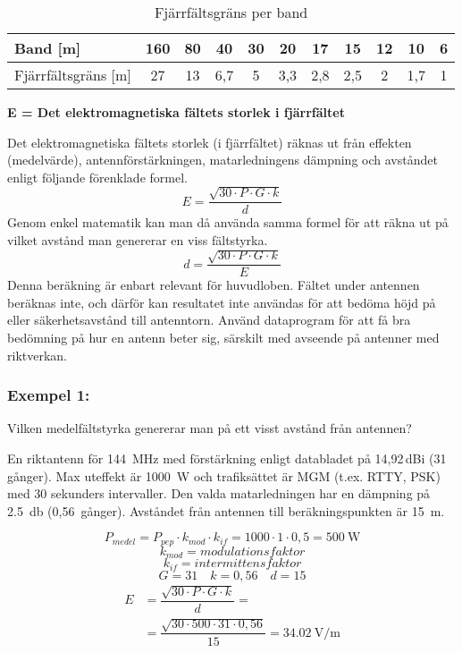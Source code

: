 \begin{table*}[ht]
  \begin{center}
    \begin{tabular}{|l|c|c|c|c|c|c|c|c|c|c|}
	\hline
	Band [m] & 160 & 80 & 40 & 30 & 20 & 17 & 15 & 12 & 10 & 6 \\ \hline
	Fjärrfältsgräns [m] & 27 & 13 & 6,7 & 5 & 3,3 & 2,8 & 2,5 & 2 & 1,7 & 1 \\ \hline
    \end{tabular}
    \caption{Fjärrfältsgräns per band}
    \label{tab:fjfltgr}
  \end{center}
\end{table*}

\noindent\textbf{E = Det elektromagnetiska fältets storlek i fjärrfältet}

Det elektromagnetiska fältets storlek (i fjärrfältet) räknas ut från
effekten (medelvärde), antennförstärkningen, matarledningens dämpning
och avståndet enligt följande förenklade formel.
\[E=\dfrac{\sqrt{30 \cdot P \cdot G \cdot k}}{d}\]
Genom enkel matematik kan man då använda samma formel för att räkna
ut på vilket avstånd man genererar en viss fältstyrka.
\[d=\dfrac{\sqrt{30 \cdot P \cdot G \cdot k}}{E}\]
Denna beräkning är enbart relevant för huvudloben.
Fältet under antennen beräknas inte, och därför kan resultatet inte användas
för att bedöma höjd på eller säkerhetsavstånd till antenntorn.
Använd dataprogram för att få bra bedömning på hur en antenn beter sig,
särskilt med avseende på antenner med riktverkan.

\subsubsection{Exempel 1:}

Vilken medelfältstyrka genererar man på ett visst avstånd från antennen?

En riktantenn för \qty{144}{\mega\hertz} med förstärkning enligt databladet på
14,92\,dBi (31 gånger).
Max uteffekt är \qty{1000}{\watt} och trafiksättet är MGM (t.ex. RTTY, PSK) med
30 sekunders intervaller.
Den valda matarledningen har en dämpning på \qty{2,5}{\decibel} (0,56~gånger).
Avståndet från antennen till beräkningspunkten är \qty{15}{\metre}.

\[P_{medel} = P_{pep} \cdot k_{mod} \cdot k_{if}
= 1000 \cdot 1 \cdot 0,5 = \qty{500}{\watt}\]
\[k_{mod} = modulationsfaktor\]
\[k_{if} = intermittensfaktor\]
\[G = 31 \quad k = 0,56 \quad d = 15\]
\begin{align*}
  E &= \dfrac{\sqrt{30 \cdot P \cdot G \cdot k}}{d} =\\
&= \dfrac{\sqrt{30 \cdot 500 \cdot 31 \cdot 0,56}}{15}
= \qty{34,02}{\volt\per\metre}
\end{align*}

